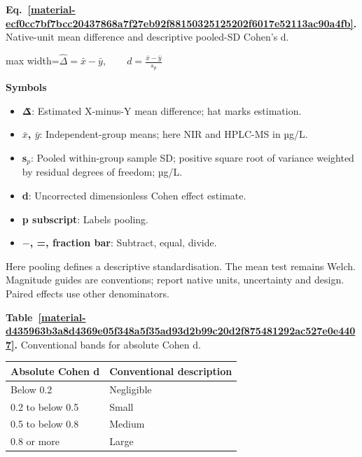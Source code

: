\documentclass[11pt,a4paper]{article}
\newcounter{scripttable}
\begin{document}
\par\medskip
\noindent\begin{minipage}{\linewidth}
\label{material-ecf0cc7bf7bcc20437868a7f27eb92f88150325125202f6017e52113ac90a4fb}
\noindent\textbf{Eq.~\ref*{material-ecf0cc7bf7bcc20437868a7f27eb92f88150325125202f6017e52113ac90a4fb}.} Native-unit mean difference and descriptive pooled-SD Cohen's d.\par\nopagebreak
\begin{center}\begin{adjustbox}{max width=\linewidth}$\displaystyle \widehat\Delta=\bar x-\bar y,\qquad d=\frac{\bar x-\bar y}{s_p}$\end{adjustbox}\end{center}

\par\noindent\textbf{Symbols}

\begin{itemize}\setlength{\itemsep}{1pt}\setlength{\parsep}{0pt}
\item \textbf{Δ̂}: Estimated X-minus-Y mean difference; hat marks estimation.
\item \textbf{\ensuremath{\bar{x}}, \ensuremath{\bar{y}}}: Independent-group means; here NIR and HPLC-MS in µg/L.
\item \textbf{s\ensuremath{{}_p}}: Pooled within-group sample SD; positive square root of variance weighted by residual degrees of freedom; µg/L.
\item \textbf{d}: Uncorrected dimensionless Cohen effect estimate.
\item \textbf{p subscript}: Labels pooling.
\item \textbf{\ensuremath{-}, =, fraction bar}: Subtract, equal, divide.
\end{itemize}

Here pooling defines a descriptive standardisation. The mean test remains Welch. Magnitude guides are conventions; report native units, uncertainty and design. Paired effects use other denominators.

\end{minipage}\par
\medskip

\par\medskip
{}
\label{material-d435963b3a8d4369e05f348a5f35ad93d2b99c20d2f875481292ac527e0e4407}
\noindent\textbf{Table~\ref*{material-d435963b3a8d4369e05f348a5f35ad93d2b99c20d2f875481292ac527e0e4407}.} Conventional bands for absolute Cohen d.\par\nopagebreak
\begin{longtable}{@{}p{}p{}@{}}
Absolute Cohen d & Conventional description \\ \hline
\endhead
Below 0.2 & Negligible \\ \hline
0.2 to below 0.5 & Small \\ \hline
0.5 to below 0.8 & Medium \\ \hline
0.8 or more & Large \\ \hline
\end{longtable}
\medskip
\end{document}
